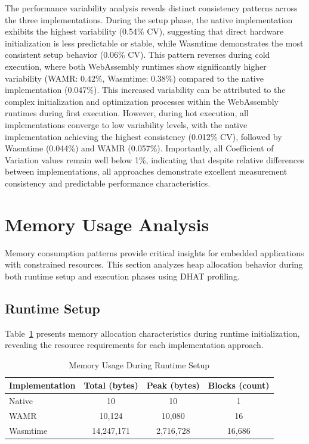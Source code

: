The performance variability analysis reveals distinct consistency patterns across the three implementations. During the setup phase, the native implementation exhibits the highest variability (0.54\% CV), suggesting that direct hardware initialization is less predictable or stable, while Wasmtime demonstrates the most consistent setup behavior (0.06\% CV). This pattern reverses during cold execution, where both WebAssembly runtimes show significantly higher variability (WAMR: 0.42\%, Wasmtime: 0.38\%) compared to the native implementation (0.047\%). This increased variability can be attributed to the complex initialization and optimization processes within the WebAssembly runtimes during first execution. However, during hot execution, all implementations converge to low variability levels, with the native implementation achieving the highest consistency (0.012\% CV), followed by Wasmtime (0.044\%) and WAMR (0.057\%). Importantly, all Coefficient of Variation values remain well below 1\%, indicating that despite relative differences between implementations, all approaches demonstrate excellent measurement consistency and predictable performance characteristics.

\section{Memory Usage Analysis}
\label{sec:eval-memory}

Memory consumption patterns provide critical insights for embedded applications with constrained resources. This section analyzes heap allocation behavior during both runtime setup and execution phases using DHAT profiling.

\subsection{Runtime Setup}
\label{subsec:memory-setup}

Table~\ref{tab:memory-setup} presents memory allocation characteristics during runtime initialization, revealing the resource requirements for each implementation approach.

\begin{table}[h]
    \centering
    \caption{Memory Usage During Runtime Setup}
    \label{tab:memory-setup}
    \begin{tabular}{lccc}
        \toprule
        \textbf{Implementation} & \textbf{Total (bytes)} & \textbf{Peak (bytes)} & \textbf{Blocks (count)} \\
        \midrule
        Native        & 10          & 10        & 1 \\
        WAMR          & 10,124      & 10,080    & 16 \\
        Wasmtime      & 14,247,171  & 2,716,728 & 16,686 \\
        \bottomrule
    \end{tabular}
\end{table}

